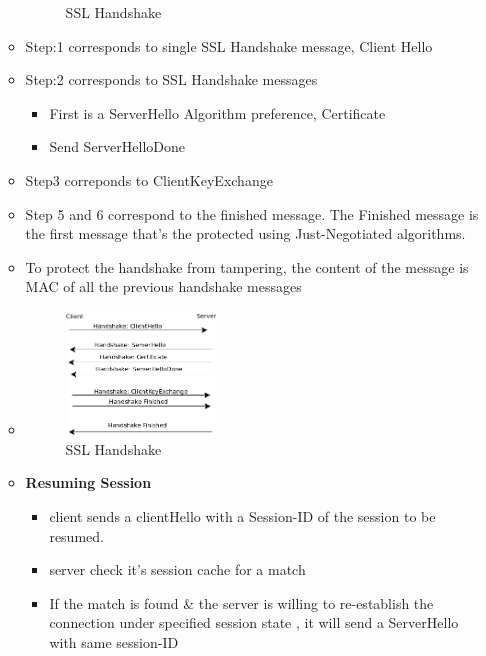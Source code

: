 \documentclass[a4paper]{article}
\begin{document}
\begin{itemize}
\begin{itemize}
\begin{figure}[ht!]
                        \caption{SSL Handshake}
                      \end{figure}
                \item Step:1 corresponds to single SSL Handshake message, Client Hello
                \item Step:2 corresponds to SSL Handshake messages
                    \begin{itemize}
                        \item First is a ServerHello { Algorithm preference, Certificate }
                        \item Send ServerHelloDone
                    \end{itemize}
                \item Step3 correponds to ClientKeyExchange
                \item Step 5 and 6 correspond to the finished message. The Finished message is the first
                    message that's the protected using Just-Negotiated algorithms.
                \item To protect the handshake from tampering, the content of the message is MAC of 
                    all the previous handshake messages
                \item \begin{figure}[ht!]
                        \centering
                        \includegraphics[width=40mm]{sslhandshake2.png}
                        \caption{SSL Handshake}
                      \end{figure}
                \item \textbf{Resuming Session}
                    \begin{itemize}
                        \item client sends a clientHello with a Session-ID of the session to be resumed.
                        \item server check it's session cache for a match
                        \item If the match is found \& the server is willing to re-establish the connection under specified
                            session state , it will send a ServerHello with same session-ID

\end{itemize}
\end{itemize}
\end{itemize}
\end{document}
